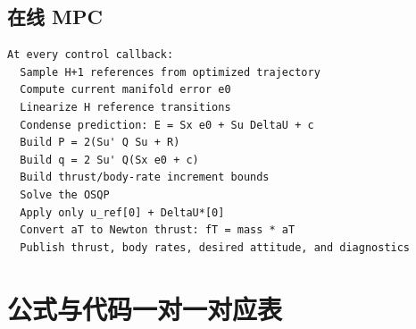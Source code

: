 \documentclass[UTF8,a4paper,11pt]{ctexart}
\begin{document}
\subsection{在线 MPC}

\begin{lstlisting}
At every control callback:
  Sample H+1 references from optimized trajectory
  Compute current manifold error e0
  Linearize H reference transitions
  Condense prediction: E = Sx e0 + Su DeltaU + c
  Build P = 2(Su' Q Su + R)
  Build q = 2 Su' Q(Sx e0 + c)
  Build thrust/body-rate increment bounds
  Solve the OSQP
  Apply only u_ref[0] + DeltaU*[0]
  Convert aT to Newton thrust: fT = mass * aT
  Publish thrust, body rates, desired attitude, and diagnostics
\end{lstlisting}

\section{公式与代码一对一对应表}
\end{document}
